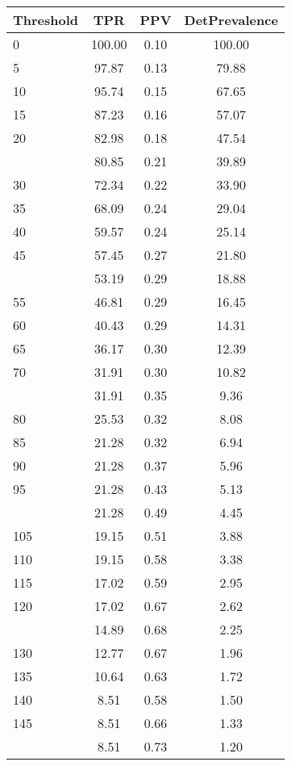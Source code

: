 \begin{table}[ht]
\centering
\begin{tabular}{lccc}
  \toprule
Threshold & TPR & PPV & DetPrevalence \\ 
  \midrule
0 & 100.00 & 0.10 & 100.00 \\ 
  5 & 97.87 & 0.13 & 79.88 \\ 
  10 & 95.74 & 0.15 & 67.65 \\ 
  15 & 87.23 & 0.16 & 57.07 \\ 
  20 & 82.98 & 0.18 & 47.54 \\ 
   \addlinespace
25 & 80.85 & 0.21 & 39.89 \\ 
  30 & 72.34 & 0.22 & 33.90 \\ 
  35 & 68.09 & 0.24 & 29.04 \\ 
  40 & 59.57 & 0.24 & 25.14 \\ 
  45 & 57.45 & 0.27 & 21.80 \\ 
   \addlinespace
50 & 53.19 & 0.29 & 18.88 \\ 
  55 & 46.81 & 0.29 & 16.45 \\ 
  60 & 40.43 & 0.29 & 14.31 \\ 
  65 & 36.17 & 0.30 & 12.39 \\ 
  70 & 31.91 & 0.30 & 10.82 \\ 
   \addlinespace
75 & 31.91 & 0.35 & 9.36 \\ 
  80 & 25.53 & 0.32 & 8.08 \\ 
  85 & 21.28 & 0.32 & 6.94 \\ 
  90 & 21.28 & 0.37 & 5.96 \\ 
  95 & 21.28 & 0.43 & 5.13 \\ 
   \addlinespace
100 & 21.28 & 0.49 & 4.45 \\ 
  105 & 19.15 & 0.51 & 3.88 \\ 
  110 & 19.15 & 0.58 & 3.38 \\ 
  115 & 17.02 & 0.59 & 2.95 \\ 
  120 & 17.02 & 0.67 & 2.62 \\ 
   \addlinespace
125 & 14.89 & 0.68 & 2.25 \\ 
  130 & 12.77 & 0.67 & 1.96 \\ 
  135 & 10.64 & 0.63 & 1.72 \\ 
  140 & 8.51 & 0.58 & 1.50 \\ 
  145 & 8.51 & 0.66 & 1.33 \\ 
   \addlinespace
150 & 8.51 & 0.73 & 1.20 \\ 

\end{tabular}
\end{table}
